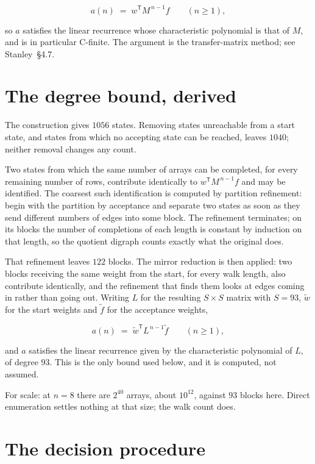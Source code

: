 \documentclass[11pt]{article}
\theoremstyle{definition}
\begin{document}
\[a(n) \;=\; w^{\mathsf T} M^{\,n-1} f \qquad (n \ge 1),\]

so $a$ satisfies the linear recurrence whose characteristic polynomial is that of $M$, and is in particular C-finite. The argument is the transfer-matrix method; see Stanley~\S4.7.

\section{The degree bound, derived}

The construction gives $1056$ states. Removing states unreachable from a start state, and states from which no accepting state can be reached, leaves $1040$; neither removal changes any count.

Two states from which the same number of arrays can be completed, for every remaining number of rows, contribute identically to $w^{\mathsf T}M^{\,n-1}f$ and may be identified. The coarsest such identification is computed by partition refinement: begin with the partition by acceptance and separate two states as soon as they send different numbers of edges into some block. The refinement terminates; on its blocks the number of completions of each length is constant by induction on that length, so the quotient digraph counts exactly what the original does.

That refinement leaves $122$ blocks. The mirror reduction is then applied: two blocks receiving the same weight from the start, for every walk length, also contribute identically, and the refinement that finds them looks at edges coming in rather than going out. Writing $L$ for the resulting $S \times S$ matrix with $S = 93$, $\tilde w$ for the start weights and $\tilde f$ for the acceptance weights,

\[a(n) \;=\; \tilde w^{\mathsf T} L^{\,n-1} \tilde f \qquad (n \ge 1),\]

and $a$ satisfies the linear recurrence given by the characteristic polynomial of $L$, of degree $93$. This is the only bound used below, and it is computed, not assumed.

For scale: at $n = 8$ there are $2^{40}$ arrays, about $10^{12}$, against $93$ blocks here. Direct enumeration settles nothing at that size; the walk count does.

\section{The decision procedure}
\end{document}
